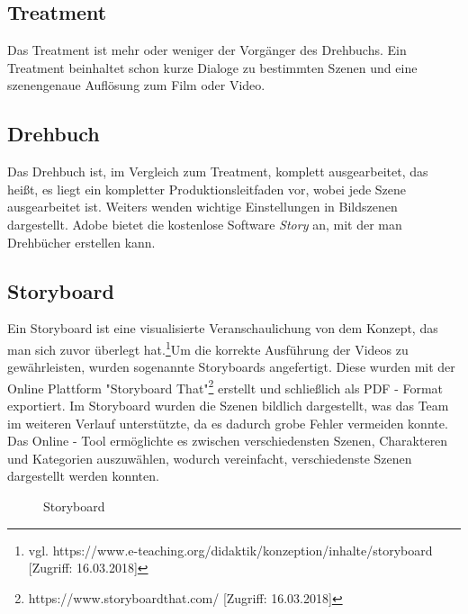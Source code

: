 \subsection{Treatment}
Das Treatment ist mehr oder weniger der Vorgänger des Drehbuchs. Ein Treatment beinhaltet schon kurze Dialoge zu bestimmten Szenen und eine szenengenaue Auflösung zum Film oder Video.
\subsection{Drehbuch}
Das Drehbuch ist, im Vergleich zum Treatment, komplett ausgearbeitet, das heißt, es liegt ein kompletter Produktionsleitfaden vor, wobei jede Szene ausgearbeitet ist. Weiters wenden wichtige Einstellungen in Bildszenen dargestellt. Adobe bietet die kostenlose Software \textit{Story} an, mit der man Drehbücher erstellen kann. 
\subsection{Storyboard}
Ein Storyboard ist eine visualisierte Veranschaulichung von dem Konzept, das man sich zuvor überlegt hat.\footnote{\label{}vgl. https://www.e-teaching.org/didaktik/konzeption/inhalte/storyboard [Zugriff: 16.03.2018]}Um die korrekte Ausführung der Videos zu gewährleisten, wurden sogenannte Storyboards angefertigt. Diese wurden mit der Online Plattform "Storyboard That"\footnote{\label{}https://www.storyboardthat.com/ [Zugriff: 16.03.2018]} erstellt und schließlich als PDF - Format exportiert.
Im Storyboard wurden die Szenen bildlich dargestellt, was das Team im weiteren Verlauf unterstützte, da es dadurch grobe Fehler vermeiden konnte.
Das Online - Tool ermöglichte es zwischen verschiedensten Szenen, Charakteren und Kategorien auszuwählen, wodurch vereinfacht, verschiedenste Szenen dargestellt werden konnten. 
\begin{figure}[H]
\begin{center}
	\caption{Storyboard}
\end{center}
\end{figure}
